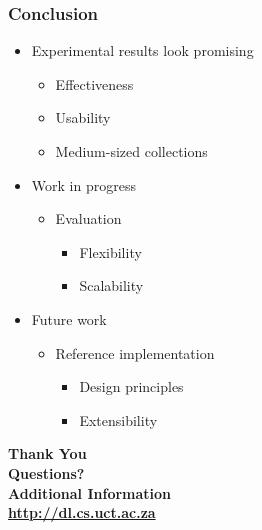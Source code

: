 \documentclass[xcolor=dvitex,t,11pt]{beamer}
\begin{document}
\begin{frame}[fragile]
\frametitle{Conclusion}

\begin{itemize}
\item Experimental results look promising
\begin{itemize}
\item Effectiveness
\item Usability
\item Medium-sized collections
\end{itemize}

\item Work in progress
\begin{itemize}
\item Evaluation
\begin{itemize}
\item Flexibility
\item Scalability
\end{itemize}
\end{itemize}

\item Future work
\begin{itemize}
\item Reference implementation
\begin{itemize} 
\item Design principles
\item Extensibility
\end{itemize}
\end{itemize}

\end{itemize}

\end{frame}

\begin{frame}[plain]
\begin{center}
\bigskip
\textbf{\fontsize{18}{18}\selectfont Thank You} \\
\textbf{\fontsize{18}{18}\selectfont Questions?} \\
\textbf{\fontsize{18}{18}\selectfont Additional Information} \\
\bigskip
\textbf{\fontsize{18}{18}\selectfont \url{http://dl.cs.uct.ac.za}}
\end{center}
\end{frame}
\end{document}
